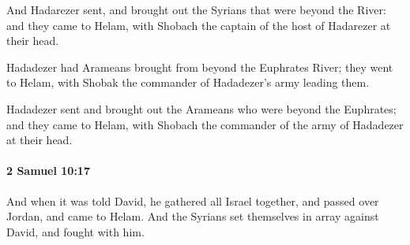 			\begin{versebox}
					\item[BHS] 
					\item[ASV] And Hadarezer sent, and brought out the Syrians that were beyond the River: and they came to Helam, with Shobach the captain of the host of Hadarezer at their head.
					\item[NIV] Hadadezer had Arameans brought from beyond the Euphrates River; they went to Helam, with Shobak the commander of Hadadezer’s army leading them.
					\item[NRSV] Hadadezer sent and brought out the Arameans who were beyond the Euphrates; and they came to Helam, with Shobach the commander of the army of Hadadezer at their head.
			\end{versebox}

		\paragraph{2 Samuel 10:17} %
			\label{2SAMUEL-10-17}

			And when it was told David, he gathered all Israel together, and passed over Jordan, and came to Helam. And the Syrians set themselves in array against David, and fought with him.

